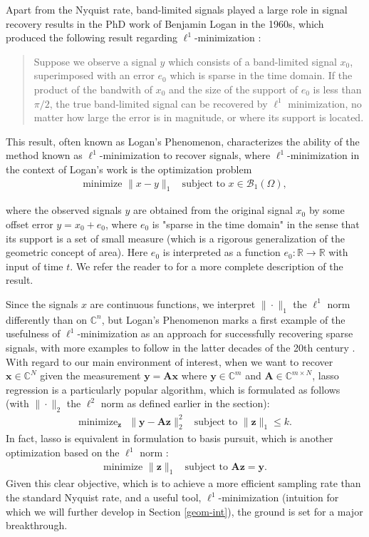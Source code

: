 \documentclass[12pt,a4paper]{amsart}
\numberwithin{equation}{section}
\theoremstyle{plain}
\theoremstyle{definition}
\newcommand{\BR}{\mathbb R}
\newcommand{\BC}{\mathbb C}
\newcommand{\bdy}{\mathbf{y}}
\newcommand{\bdx}{\mathbf{x}}
\newcommand{\bdz}{\mathbf{z}}
\newcommand{\bdA}{\mathbf{A}}
\begin{document}
Apart from the Nyquist rate, band-limited signals played a large role in signal recovery results in the PhD work of Benjamin Logan in the 1960s, which produced the following result regarding $\ell^1$-minimization \cite{logan}:

\begin{quote}
    Suppose we observe a signal $y$ which consists of a band-limited signal $x_0$, superimposed with an error $e_0$ which is sparse in the time domain. If the product of the bandwith of $x_0$ and the size of the support of $e_0$ is less than $\pi/2$, the true band-limited signal can be recovered by $\ell^1$ minimization, no matter how large the error is in magnitude, or where its support is located.
\end{quote}

This result, often known as Logan's Phenomenon, characterizes the ability of the method known as $\ell^1$-minimization to recover signals, where $\ell^1$-minimization in the context of Logan's work is the optimization problem
\begin{align*}
    \text{minimize } \|x-y\|_1 \ \ \ \ \text{subject to } x\in\mathcal{B}_1(\Omega),
\end{align*}

where the observed signals $y$ are obtained from the original signal $x_0$ by some offset error $y=x_0+e_0$, where $e_0$ is "sparse in the time domain" in the sense that its support is a set of small measure (which is a rigorous generalization of the geometric concept of area). Here $e_0$ is interpreted as a function $e_0:\BR\rightarrow\BR$ with input of time $t$. We refer the reader to \cite{logan} for a more complete description of the result.

Since the signals $x$ are continuous functions, we interpret $\|\cdot\|_1$ the $\ell^1$ norm differently than on $\BC^n$, but Logan's Phenomenon marks a first example of the usefulness of $\ell^1$-minimization as an approach for successfully recovering sparse signals, with more examples to follow in the latter decades of the 20th century \cite{wm}. With regard to our main environment of interest, when we want to recover $\bdx\in\BC^N$ given the measurement $\bdy=\bdA\bdx$ where $\bdy\in\BC^m$ and $\bdA\in\BC^{m\times N}$, lasso regression is a particularly popular algorithm, which is formulated as follows (with $\|\cdot\|_2$ the $\ell^2$ norm as defined earlier in the section):
\begin{align*}
    \text{minimize}_\bdz\text{ } \|\bdy-\bdA\bdz\|_2^2 \ \ \ \ \text{subject to } \|\bdz\|_1\leq k.
\end{align*}
In fact, lasso is equivalent in formulation to basis pursuit, which is another optimization based on the $\ell^1$ norm \cite{wm}:
\begin{align} \label{l1}
    \text{minimize } \|\bdz\|_1 \ \ \ \ \text{subject to } \bdA\bdz=\bdy.
\end{align}
Given this clear objective, which is to achieve a more efficient sampling rate than the standard Nyquist rate, and a useful tool, $\ell^1$-minimization (intuition for which we will further develop in Section \ref{geom-int}), the ground is set for a major breakthrough.
\end{document}

